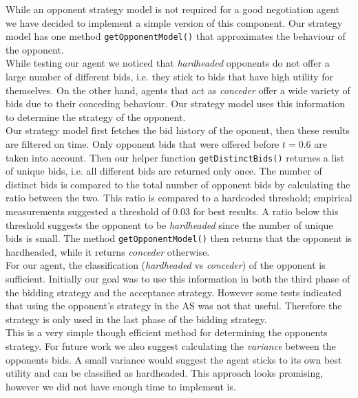 
While an opponent strategy model is not required for a good negotiation agent we have decided to implement a simple version of this component. Our strategy model has one method \texttt{getOpponentModel()} that approximates the behaviour of the opponent. \\

While testing our agent we noticed that \emph{hardheaded} opponents do not offer a large number of different bids, i.e. they stick to bids that have high utility for themselves. On the other hand, agents that act as \emph{conceder} offer a wide variety of bids due to their conceding behaviour. Our strategy model uses this information to determine the strategy of the opponent. \\

Our strategy model first fetches the bid history of the oponent, then these results are filtered on time. Only opponent bids that were offered before $t=0.6$ are taken into account. Then our helper function \texttt{getDistinctBids()} returnes a list of unique bids, i.e. all different bids are returned only once. The number of distinct bids is compared to the total number of opponent bids by calculating the ratio between the two. This ratio is compared to a hardcoded threshold; empirical measurements suggested a threshold of $0.03$ for best results. A ratio below this threshold suggests the opponent to be \emph{hardheaded} since the number of unique bids is small. The method \texttt{getOpponentModel()} then returns that the opponent is hardheaded, while it returns \emph{conceder} otherwise. \\

For our agent, the classification (\emph{hardheaded} vs \emph{conceder}) of the opponent is sufficient. Initially our goal was to use this information in both the third phase of the bidding strategy and the acceptance strategy. However some tests indicated that using the opponent's strategy in the AS was not that useful. Therefore the strategy is only used in the last phase of the bidding strategy. \\

This is a very simple though efficient method for determining the opponents strategy. For future work we also suggest calculating the \emph{variance} between the opponents bids. A small variance would suggest the agent sticks to its own best utility and can be classified as hardheaded. This approach looks promising, however we did not have enough time to implement is.

